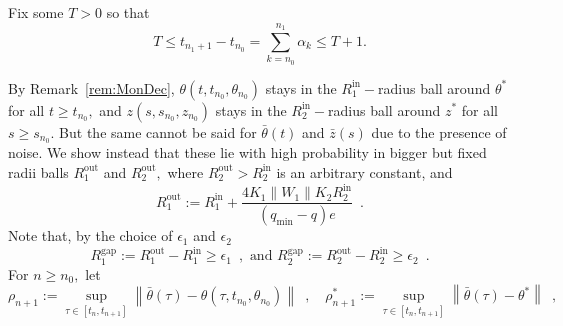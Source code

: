 \documentclass[usenames,dvipsnames,final,12pt]{colt2018} %
\newcommand{\Xt}{X_1}
\newcommand{\Wt}{W_1}
\newcommand{\st}{\alpha}
\newcommand{\et}{\epsilon_1}
\newcommand{\etg}{R_1^{\textrm{gap}}}
\newcommand{\Rto}{R_1^\textrm{out}}
\newcommand{\Rti}{R_1^{\textrm{in}}}
\newcommand{\thS}{\theta^*}
\newcommand{\rt}{\rho}
\newcommand{\rtS}{\rho^{*}}
\newcommand{\bart}{\bar{\theta}}
\newcommand{\Kt}{K_1}
\newcommand{\tSol}[1]{\theta(#1, \tI{n_0}, \theta_{n_0})}
\newcommand{\ez}{\epsilon_2}
\newcommand{\ezg}{R_2^{\textrm{gap}}}
\newcommand{\Rzo}{R_2^{\textrm{out}}}
\newcommand{\Rzi}{R_2^{\textrm{in}}}
\newcommand{\barz}{\bar{z}}
\newcommand{\Kz}{K_2}
\newcommand{\zSol}[1]{z(#1, \sI{n_0}, z_{n_0})}
\newcommand{\lmin}{q_{\min}}
\newcommand{\lm}{q}
\newcommand{\tI}[1]{t_{#1}}
\newcommand{\sI}[1]{s_{#1}}
\newcommand{\cE}{\mathcal{E}}
\newcommand{\norm}[1]{\left\lVert#1\right\rVert}
\newcommand{\zS}{z^*}
\newcommand{\gal}[1]{#1}
\newcommand{\gugan}[1]{#1}
\begin{document}
%
%

{Fix some $T>0$ so that
	\begin{equation}
	\label{eqn:n1Cond}
	T \leq t_{n_1 + 1} - t_{n_0} = \sum_{k = n_0}^{n_1} \st_k \leq T + 1.
	\end{equation}
}%


%

By Remark~\ref{rem:MonDec}, $\tSol{t}$ stays in the $\Rti-$radius ball  around $\thS$ for all \gal{$t \geq \tI{n_0},$} and $\zSol{s}$ stays in the $\Rzi-$radius ball around $\zS$ for all \gal{$s \geq \sI{n_0} .$} But the same cannot be said for $\bart(t)$ and $\barz(s)$ due to the presence of noise. We  show instead that these lie with high probability in bigger but fixed radii balls $\Rto$ and $\Rzo,$ where $\Rzo > \Rzi$ is an arbitrary constant, and
%
{
	\begin{equation}
	\label{eq: defn of Rto}
	\Rto := \Rti + \frac{4\Kt \norm{\Wt} \Kz \Rzi}{(\lmin-\lm)e}
	\enspace.
	\end{equation}
	Note that, by the choice of $\et$ and $\ez$}
%
\begin{equation} \label{eq:epsilon smaller than R}
\etg := \Rto - \Rti \geq \et \enspace, \text{ and }\ezg  := \Rzo - \Rzi \geq \ez \enspace.
\end{equation}
%
%
For \gal{$n \geq n_0,$} let
%
\begin{equation}
\label{defn:rhot}
\rt_{n + 1} := \sup\limits_{\tau \in [\tI{n}, \tI{n + 1}]}\norm{\bart(\tau) - \tSol{\tau}} \enspace, \quad
%
\rtS_{n + 1} := \sup\limits_{\tau \in [\tI{n}, \tI{n + 1}]} \norm{\bart(\tau) - \thS} \enspace,
\end{equation}
\end{document}
